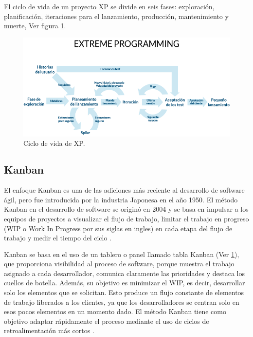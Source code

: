 \par El ciclo de vida de un proyecto XP se divide en seis fases: exploración, planificación, iteraciones para el lanzamiento, producción, mantenimiento y muerte, Ver figura \ref{fig:xp01}. 

\begin{figure}[htpb!]
	\centering
	\includegraphics[width=0.91\columnwidth]{images/xp01.png}
	\caption{Ciclo de vida de XP.}
	\label{fig:xp01}
\end{figure}

\subsection{Kanban}

\par El enfoque Kanban es una de las adiciones más reciente al desarrollo de software ágil, pero fue introducida por la industria Japonesa en el año 1950. El método Kanban en el desarrollo de software se originó en 2004 y se basa en impulsar a los equipos de proyectos a visualizar el flujo de trabajo, limitar el trabajo en progreso (WIP o Work In Progress por sus siglas en ingles) en cada etapa del flujo de trabajo y medir el tiempo del ciclo \cite{LIB22}.\\ 

\par Kanban se basa en el uso de un tablero o panel llamado tabla Kanban  (Ver \ref{fig:xp01}), que  proporciona visibilidad al proceso de software, porque muestra el trabajo asignado a cada desarrollador, comunica claramente las prioridades y destaca los cuellos de botella. Además, su objetivo es minimizar el WIP, es decir, desarrollar solo los elementos que se solicitan. Esto produce un flujo constante de elementos de trabajo liberados a los clientes, ya que los desarrolladores se centran solo en esos pocos elementos en un momento dado. El método Kanban tiene como objetivo adaptar rápidamente el proceso mediante el uso de ciclos de retroalimentación más cortos \cite{LIB22}.\\

